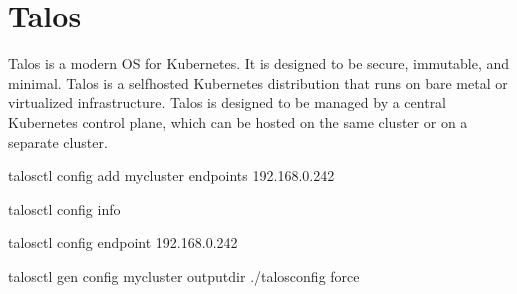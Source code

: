 \documentclass[letterpaper,10pt,english]{sphinxmanual}
\begin{document}
\sphinxstepscope


\chapter{Talos}
\label{\detokenize{talos:talos}}\label{\detokenize{talos::doc}}
\sphinxAtStartPar
Talos is a modern OS for Kubernetes. It is designed to be secure, immutable, and minimal. Talos is a self\sphinxhyphen{}hosted Kubernetes distribution that runs on bare metal or virtualized infrastructure. Talos is designed to be managed by a central Kubernetes control plane, which can be hosted on the same cluster or on a separate cluster.

\sphinxAtStartPar
talosctl config add my\sphinxhyphen{}cluster \textendash{}endpoints 192.168.0.242

\sphinxAtStartPar
talosctl config info

\sphinxAtStartPar
talosctl config endpoint 192.168.0.242

\sphinxAtStartPar
talosctl gen config my\sphinxhyphen{}cluster  \textendash{}output\sphinxhyphen{}dir ./talos\sphinxhyphen{}config \textendash{}force
\end{document}
